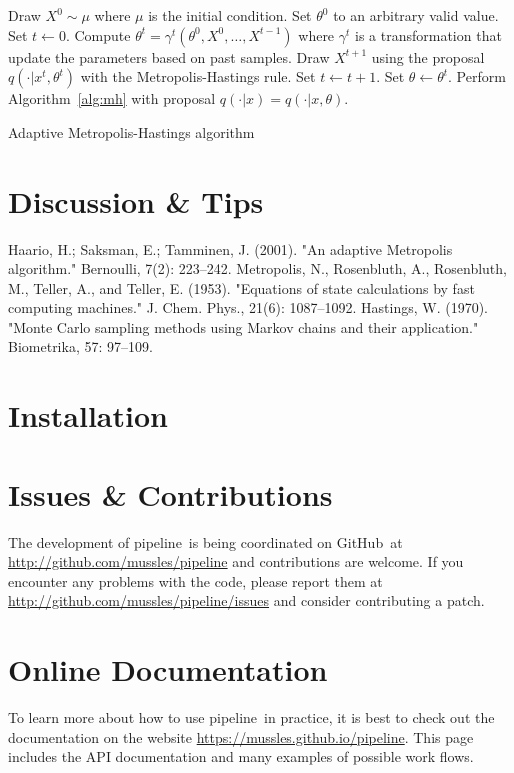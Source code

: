 \documentclass[12pt,preprint]{aastex}
\newcommand{\project}[1]{{\sffamily #1}}
\newcommand{\github}{\project{GitHub}}
\newcommand{\thisplain}{pipeline}
\newcommand{\this}{\project{\thisplain}}
\newcommand{\sectlabel}[1]{\label{sect:#1}}
\begin{document}
\begin{algorithm}
\begin{algorithmic}
  \tophrule
  \STATE Draw $X^0\sim\mu$ where $\mu$ is the initial condition.
  \STATE Set $\theta^0$ to an arbitrary valid value.
  \STATE Set $t\leftarrow0$.
  \REPEAT
      \STATE Compute $\theta^t = \gamma^t(\theta^0,X^0,\dots,X^{t-1})$ where
      $\gamma^t$ is a transformation that update the parameters based on past
      samples.
      \STATE Draw $X^{t + 1}$ using the proposal $q(\cdot|x^t,\theta^t)$ with
      the Metropolis-Hastings rule.
      \STATE Set $t\leftarrow t+1$.
  \STATE Set $\theta\leftarrow\theta^t$.
  \STATE Perform Algorithm~\ref{alg:mh} with proposal $q(\cdot|x) =
  q(\cdot|x,\theta)$.
  \bottomhrule
\end{algorithmic}
\caption{Adaptive Metropolis-Hastings algorithm}
\label{alg:adaptive rw}
\end{algorithm}

\section{Discussion \& Tips}\sectlabel{advice}

\begin{thebibliography}{}\raggedright
{}
    Haario, H.; Saksman, E.; Tamminen, J. (2001). "An adaptive Metropolis algorithm." Bernoulli, 7(2): 223–242.
    Metropolis, N., Rosenbluth, A., Rosenbluth, M., Teller, A., and Teller, E. (1953). "Equations of state calculations by fast computing machines." J. Chem. Phys., 21(6): 1087–1092.
    Hastings, W. (1970). "Monte Carlo sampling methods using Markov chains and their application." Biometrika, 57: 97–109.
\end{thebibliography}

\clearpage
\appendix
\section{Installation}\sectlabel{install}

\section{Issues \& Contributions}

The development of \this\ is being coordinated on \github\ at
\url{http://github.com/mussles/pipeline} and contributions are welcome. If you
encounter any problems with the code, please report them at
\url{http://github.com/mussles/pipeline/issues} and consider
contributing a patch.

\section{Online Documentation}

To learn more about how to use \this\ in practice, it is best to check out the
documentation on the website \url{https://mussles.github.io/pipeline}. This page includes
the API documentation and many examples of possible work flows.
\end{document}
